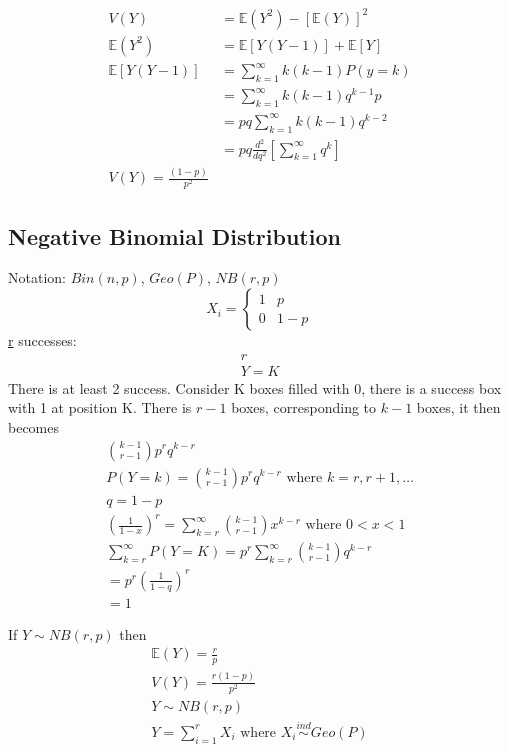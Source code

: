 \documentclass{article}
\begin{document}
\begin{align*}
    V(Y)               & = \mathbb{E}(Y^2) - [\mathbb{E}(Y)]^2         \\
    \mathbb{E}(Y^2)    & = \mathbb{E}[Y(Y-1)] + \mathbb{E}[Y]          \\
    \mathbb{E}[Y(Y-1)] & = \sum_{k=1}^{\infty}k(k-1)P(y=k)             \\
                       & = \sum_{k=1}^{\infty}k(k-1)q ^{k-1}p          \\
                       & = pq \sum_{k=1}^{\infty}k(k-1)q ^{k-2}        \\
                       & = pq \frac{d^2}{dq^2}[\sum_{k=1}^{\infty}q^k] \\
    V(Y) = \frac{(1-p)}{p^2}
\end{align*}

\subsection{Negative Binomial Distribution}
Notation: $Bin(n,p)$, $Geo(P)$, $NB(r,p)$
\[
    X_i = \begin{cases}
        1 & p   \\
        0 & 1-p
    \end{cases}
\]
\underline{r} successes:
\begin{gather*}
    r \\
    Y = K
\end{gather*}
There is at least 2 success. Consider K boxes filled with 0, there is a success box
with 1 at position K. There is $r-1$ boxes, corresponding to $k-1$ boxes, it then becomes
\begin{gather*}
    \binom{k-1}{r-1}p^rq ^{k-r}                                                        \\
    P(Y=k)             = \binom{k-1}{r-1}p^rq ^{k-r} \text{ where } k = r, r+1, \dots \\
    q                  = 1-p                                                          \\
    \boxed{(\frac{1}{1-x})^r  = \sum_{k=r}^{\infty} \binom{k-1}{r-1} x ^{k-r} \text{ where }
        0 < x < 1} \\
    \sum_{k=r}^{\infty} P ( Y=K) = p^r \sum_{k=r}^{\infty}\binom{k-1}{r-1} q ^{k-r} \\
    = p^r (\frac{1}{1-q})^r \\
    =1
\end{gather*}

If $Y \sim NB(r,p)$ then
\begin{gather*}
    \mathbb{E}(Y) = \frac{r}{p} \\
    V(Y) = \frac{r(1-p)}{p^2} \\
    Y \sim NB (r, p) \\
    Y = \sum_{i=1}^{r} X_i \text{ where } X_i \stackrel{ind}{\sim} Geo(P)
\end{gather*}
\end{document}
